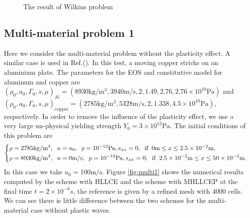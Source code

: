 \documentclass{article}
\numberwithin{equation}{section}
\numberwithin{table}{section}
\begin{document}
\begin{figure}
	  \caption{ The result of Wilkins problem}
	  \label{fig:Wilkins1}
	\end{figure}

	\subsection{Multi-material problem 1} \label{pro:multi1}
  Here we consider the multi-material problem without the plasticity effect. A similar case is used in Ref.(\cite{ghaisas2016high}). In this test, a moving  copper stricks on an aluminium plate. The parameters for the EOS and constitutive model for aluminum and copper  are
$ (\rho_0, a_0, \Gamma_0, s, \mu)_{\text{Al}} =(8930 \text{kg}/\text{m}^3, 3940 \text{m}/\text{s},2, 1.49, 2.76 ,2.76\times 10^{10} \text{Pa} )$ and   $(\rho_0, a_0, \Gamma_0, s, \mu)_{\text{copper}} =(2785 \text{kg}/\text{m}^3, 5328 \text{m}/\text{s},2, 1.338,4.5\times 10^{10}\text{Pa})$, respectively. In order to remove the influence of the plasticity effect, we use a very large un-physical yielding strength $Y_0 = 3\times 10^{12} \text{Pa}$.  The initial conditions of this problem are
\begin{equation}\label{eq:initmulti}
  \left\{ \begin{aligned}
	& \rho = 2785 \text{kg}/\text{m}^3, \hspace{0.2cm} u = u_0, \hspace{0.2cm} p = 10^{-12}\text{Pa}, s_{xx} = 0, \hspace{0.2cm} \text{if} \hspace{0.2cm} 0\text{m} \le x \le 2.5\times 10^{-2} \text{m},\\
	&  \rho = 8930 \text{kg}/\text{m}^3, \hspace{0.2cm} u = 0\text{m}/\text{s}, \hspace{0.2cm} p = 10^{-12}\text{Pa}, s_{xx} = 0, \hspace{0.2cm} \text{if} \hspace{0.2cm} 2.5 \times 10^{-2}\text{m} \le x \le 50\times 10^{-2} \text{m}.\\
	\end{aligned}
  \right.
\end{equation}
In this case we take $u_0 = 100 \text{m}/\text{s}$. Figure \ref{fig:multi1}  shows  the numerical results computed by the scheme with HLLCE and the scheme with MHLLCEP at the final time $ t= 2 \times 10^{-6}s$, the reference is given by a refined mesh  with 4000 cells.  We can see there is little difference between the two schemes  for  the multi-material case without plastic waves.
\end{document}
